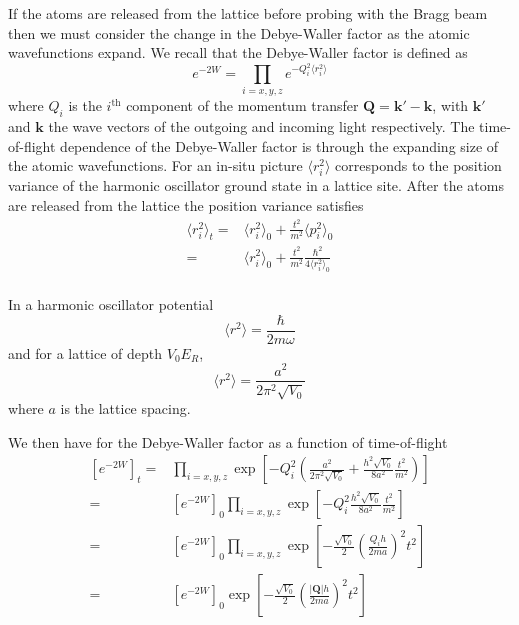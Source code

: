 \documentclass[11pt,letter]{article}
\newcommand{\bv}[1]{\ensuremath{\bm{#1}}}
\begin{document}
If the atoms are released from the lattice before probing with the Bragg beam
then we must consider the change in the Debye-Waller factor as the atomic
wavefunctions expand.  We recall that the Debye-Waller factor is defined as
\begin{equation}
    e^{-2W} = 
      \prod_{i=x,y,z} e^{ -Q_{i}^{2}\langle r_{i} ^{2} \rangle } 
\end{equation}
where $Q_{i}$ is the $i^{\text{th}}$ component of the momentum transfer $\bv{Q}
= \bv{k}' - \bv{k}$,  with $\bv{k}'$ and $\bv{k}$ the wave vectors of the
outgoing and incoming light respectively.  The time-of-flight dependence of the
Debye-Waller factor is through the expanding size of the atomic wavefunctions.
For an in-situ picture $\langle r_{i}^{2}\rangle$ corresponds to the position
variance of the harmonic oscillator ground state in a lattice site.  After the atoms
are released from the lattice the position variance satisfies
\begin{equation}
\begin{split} 
  \langle r_{i}^{2} \rangle_{t} = &
   \langle r_{i}^{2} \rangle_{0} + 
  \frac{t^{2}}{m^{2}} \langle p_{i}^{2} \rangle_{0} \\
  = &  \langle r_{i}^{2} \rangle_{0} + 
  \frac{t^{2}}{m^{2}} \frac{\hbar^{2}}{4  \langle r_{i}^{2} \rangle_{0} } \\
\end{split}
\end{equation} 

In a harmonic oscillator potential 
\begin{equation}
    \langle r^{2} \rangle = \frac{\hbar}{2 m \omega}
\end{equation}
and for a lattice of depth $V_{0}E_{R}$,  
\begin{equation}
    \langle r^{2} \rangle = \frac{a^{2}}{ 2 \pi^{2} \sqrt{V_{0}} }
\end{equation}
where $a$ is the lattice spacing. 

We then have for the Debye-Waller factor as a function of time-of-flight
\begin{equation}
\begin{split}
    [e^{-2W}]_{t} = &  
      \prod_{i=x,y,z} \exp\left[  -Q_{i}^{2} 
      \left(  \frac{a^{2}}{ 2 \pi^{2} \sqrt{V_{0}}} 
            + \frac{ h^{2} \sqrt{V_{0}} }{8 a^{2}} 
              \frac{ t^{2}}{m^{2} }\right) \right] \\
    =& [e^{-2W}]_{0} \prod_{i=x,y,z} \exp\left[  -Q_{i}^{2} 
            \frac{ h^{2} \sqrt{V_{0}} }{8 a^{2}} 
              \frac{ t^{2}}{m^{2} } \right] \\
    =& [e^{-2W}]_{0} \prod_{i=x,y,z} \exp\left[ -\frac{\sqrt{V_{0}}}{2}
           \left( \frac{ Q_{i} h }{2 m a  } \right)^{2}  t^{2}   \right] \\
    =& [e^{-2W}]_{0} \exp\left[ -\frac{\sqrt{V_{0}}}{2}
           \left( \frac{ |\bv{Q}| h }{2 m a  } \right)^{2}  t^{2}   \right] \\
\end{split}
\end{equation}
\end{document}
